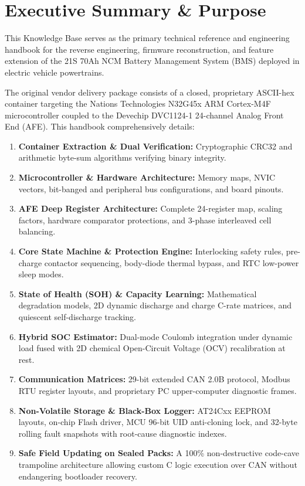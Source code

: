 \documentclass[10pt,a4paper]{article}
\begin{document}
\tableofcontents
\newpage

\section{Executive Summary \& Purpose}
This Knowledge Base serves as the primary technical reference and engineering handbook for the reverse engineering, firmware reconstruction, and feature extension of the 21S 70Ah NCM Battery Management System (BMS) deployed in electric vehicle powertrains.

The original vendor delivery package consists of a closed, proprietary ASCII-hex container targeting the Nations Technologies N32G45x ARM Cortex-M4F microcontroller coupled to the Devechip DVC1124-1 24-channel Analog Front End (AFE). This handbook comprehensively details:
\begin{enumerate}
    \item \textbf{Container Extraction \& Dual Verification:} Cryptographic CRC32 and arithmetic byte-sum algorithms verifying binary integrity.
    \item \textbf{Microcontroller \& Hardware Architecture:} Memory maps, NVIC vectors, bit-banged and peripheral bus configurations, and board pinouts.
    \item \textbf{AFE Deep Register Architecture:} Complete 24-register map, scaling factors, hardware comparator protections, and 3-phase interleaved cell balancing.
    \item \textbf{Core State Machine \& Protection Engine:} Interlocking safety rules, pre-charge contactor sequencing, body-diode thermal bypass, and RTC low-power sleep modes.
    \item \textbf{State of Health (SOH) \& Capacity Learning:} Mathematical degradation models, 2D dynamic discharge and charge C-rate matrices, and quiescent self-discharge tracking.
    \item \textbf{Hybrid SOC Estimator:} Dual-mode Coulomb integration under dynamic load fused with 2D chemical Open-Circuit Voltage (OCV) recalibration at rest.
    \item \textbf{Communication Matrices:} 29-bit extended CAN 2.0B protocol, Modbus RTU register layouts, and proprietary PC upper-computer diagnostic frames.
    \item \textbf{Non-Volatile Storage \& Black-Box Logger:} AT24Cxx EEPROM layouts, on-chip Flash driver, MCU 96-bit UID anti-cloning lock, and 32-byte rolling fault snapshots with root-cause diagnostic indexes.
    \item \textbf{Safe Field Updating on Sealed Packs:} A 100\% non-destructive code-cave trampoline architecture allowing custom C logic execution over CAN without endangering bootloader recovery.
\end{enumerate}
\end{document}
